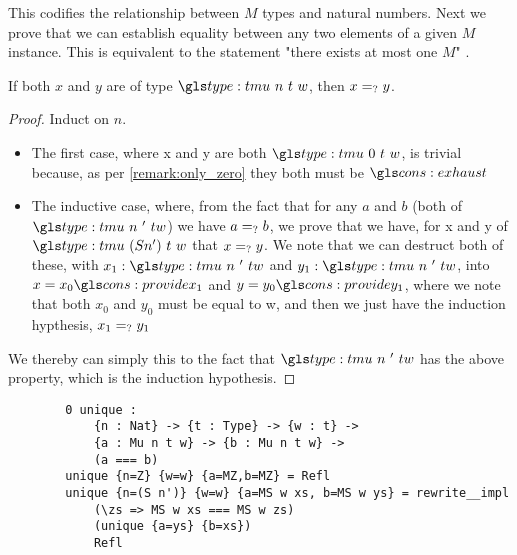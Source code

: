 This codifies the relationship between $M$ types and natural numbers.
Next we prove that we can establish equality between any two elements of a given $M$ instance.
This is equivalent to the statement "there exists at most one $M$" \needcite.

\begin{lemma}
	\label{lem:all_eq}
	If both $x$ and $y$ are of type $\tm n t w$, then $x =_? y$.
\end{lemma}
\begin{proof}
	Induct on $n$.
	\begin{itemize}
		\item The first case, where \sigil x and \sigil y are both $\tm 0 t w$, is trivial because, as per \ref{remark:only_zero} they both must be $\mz$
		\item The inductive case, where, from the fact that for any $a$ and $b$ (both of $\tm n' t w$) we have $a =_? b$, we prove that we have, for \sigil x and \sigil y of $\tm {(S n')} t w$ that $x =_? y$.
		We note that we can destruct both of these, with $x_1 : \tm n' t w$ and $y_1 : \tm n' t w$, into $x = x_0 \ms x_1$ and $y = y_0 \ms y_1$, where we note that both $x_0$ and $y_0$ must be equal to \sigil w, and then we just have the induction hypthesis, $x_1 =_? y_1$
	\end{itemize}
	
	We thereby can simply this to the fact that $\tm n' t w$ has the above property, which is the induction hypothesis.
\end{proof}

\begin{listing}
	\begin{verbatim}
		0 unique : 
			{n : Nat} -> {t : Type} -> {w : t} -> 
			{a : Mu n t w} -> {b : Mu n t w} -> 
			(a === b)
		unique {n=Z} {w=w} {a=MZ,b=MZ} = Refl 
		unique {n=(S n')} {w=w} {a=MS w xs, b=MS w ys} = rewrite__impl 
			(\zs => MS w xs === MS w zs)
			(unique {a=ys} {b=xs})
			Refl
	
	\end{verbatim}
	\caption{Proof of \ref{lem:all_eq} in Idris}
	\label{lst:all_eq}
\end{listing}


